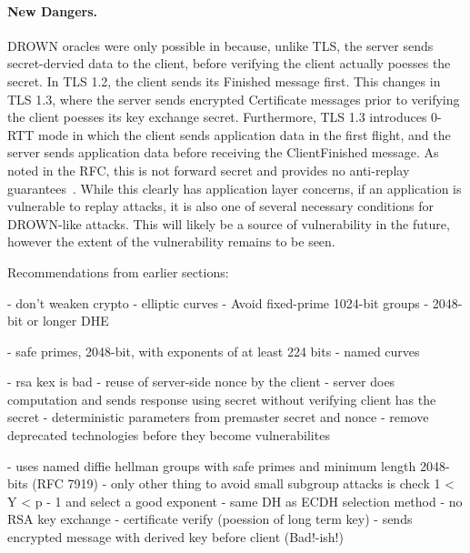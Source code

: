\paragraph{New Dangers.}
DROWN oracles were only possible in \ssltwo because, unlike TLS, the server
sends secret-dervied data to the client, before verifying the client actually
poesses the secret. In TLS 1.2, the client sends its \textsf{Finished}
message first. This changes in TLS 1.3, where the server sends encrypted
\textsf{Certificate} messages prior to verifying the client poesses its key
exchange secret. Furthermore, TLS 1.3 introduces 0-RTT mode in which the
client sends application data in the first flight, and the server sends
application data before receiving the \textsf{ClientFinished} message. As
noted in the RFC, this is not forward secret and provides no anti-replay
guarantees~\cite{rfc8446}. While this clearly has application layer concerns,
if an application is vulnerable to replay attacks, it is also one of several
necessary conditions for DROWN-like attacks. This will likely be a source of
vulnerability in the future, however the extent of the vulnerability remains
to be seen.

Recommendations from earlier sections:

- don't weaken crypto
- elliptic curves
- Avoid fixed-prime 1024-bit groups
- 2048-bit or longer DHE

- safe primes, 2048-bit, with exponents of at least 224 bits
- named curves

- rsa kex is bad
- reuse of server-side nonce by the client
- server does computation and sends response using secret without verifying client has the secret
- deterministic parameters from premaster secret and nonce
- remove deprecated technologies before they become vulnerabilites

- uses named diffie hellman groups with safe primes and minimum length 2048-bits (RFC 7919)
- only other thing to avoid small subgroup attacks is check 1 < Y < p - 1 and select a good exponent
- same DH as ECDH selection method
- no RSA key exchange
- certificate verify (poession of long term key)
- sends encrypted message with derived key before client (Bad!-ish!)

\fi

%
%

